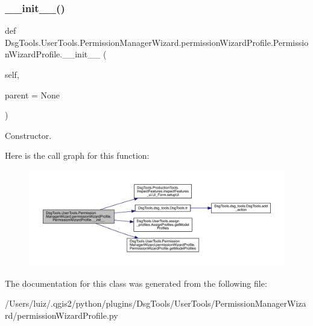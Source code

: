 \subsubsection{\texorpdfstring{\+\_\+\+\_\+init\+\_\+\+\_\+()}{\_\_init\_\_()}}
{\footnotesize\ttfamily def Dsg\+Tools.\+User\+Tools.\+Permission\+Manager\+Wizard.\+permission\+Wizard\+Profile.\+Permission\+Wizard\+Profile.\+\_\+\+\_\+init\+\_\+\+\_\+ (\begin{DoxyParamCaption}\item[{}]{self,  }\item[{}]{parent = {\ttfamily None} }\end{DoxyParamCaption})}

\begin{DoxyVerb}Constructor.\end{DoxyVerb}
 Here is the call graph for this function\+:
\nopagebreak
\begin{figure}[H]
\begin{center}
\leavevmode
\includegraphics[width=350pt]{class_dsg_tools_1_1_user_tools_1_1_permission_manager_wizard_1_1permission_wizard_profile_1_1_permission_wizard_profile_a49bbc6af0310098a45f4936ddafbcba7_cgraph}
\end{center}
\end{figure}


The documentation for this class was generated from the following file\+:\begin{DoxyCompactItemize}
\item 
/\+Users/luiz/.\+qgis2/python/plugins/\+Dsg\+Tools/\+User\+Tools/\+Permission\+Manager\+Wizard/permission\+Wizard\+Profile.\+py\end{DoxyCompactItemize}
